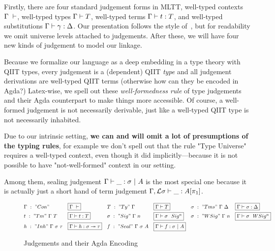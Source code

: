 Firstly, there are four standard judgement forms in MLTT,
well-typed contexts $\goodCtx{\Gamma}{l}$, well-typed types
$\goodType{\Gamma}{T}{l}$, well-typed terms $\goodTerm{\Gamma}{t}{T}$, and
well-typed substitutions $\goodSub{\Gamma}{\gamma}{\Delta}$. Our presentation
follows the style of~\citet{kaposi2019gluing}, but for readability we
omit universe levels attached to judgements.
After these,
we will have four new kinds of judgement to model our linkage.

Because we formalize our language as a deep embedding in a type theory with QIIT types, every judgement is a (dependent) QIIT \textit{type} and all judgement derivations are well-typed QIIT terms (otherwise how can they be encoded in Agda?)
Latex-wise, we spell out these \textit{well-formedness rule} of type
judgements and their Agda counterpart to make things more accessible. Of
course, a well-formed judgement is not necessarily derivable, just like
a well-typed QIIT type is not necessarily inhabited.

Due to our intrinsic setting, \textbf{we can and will omit a lot of presumptions of the typing rules}, for example we don't spell out that the rule "Type Universe" requires a well-typed context, even though it did implicitly---because it is not possible to have "not-well-formed" context in our setting.

Among them, sealing judgement $\goodSeal{\Gamma}{\_}{\sigma}{A}$ is the most special one because it is actually just a short hand of term judgement $\goodTerm{\Gamma , \cL \sigma}{\_}{A[\pi_1]}$. 



\newcommand\mathboxtext[1]{
  \fcolorbox{black}{faint-gray}{\ensuremath{#1}}
}

\begin{figure}[!htb]
  \begin{align*}
    &\Gamma~:~"Con"&&\mathboxtext{\goodCtx{\Gamma}{}} &&T~:~"Ty"~\Gamma&&\mathboxtext{\goodType{\Gamma}{T}{}}  &&\sigma~:~"Tms"~\Gamma~\Delta&&\mathboxtext{\goodSub{\Gamma}{\sigma}{\Delta}}  \\ & t~:~"Tm"~\Gamma~T&&\mathboxtext{\goodTerm{\Gamma}{t}{T}} 
    &&\sigma~:~"Sig"~\Gamma~n&&\mathboxtext{\goodSig{\Gamma}{\sigma}{n}}  &&\sigma~:~"WSig"~\Gamma~n&&\mathboxtext{\goodWSig{\Gamma}{\sigma}{n}} \\ &h~:~"Inh"~\Gamma~\sigma~\tau&&\mathboxtext{\goodInh{\Gamma}{h}{\sigma}{\tau}} && f~:~"Seal"~\Gamma~\sigma~A&&\mathboxtext{\goodSeal{\Gamma}{f}{\sigma}{A}}
  \end{align*}
\caption{Judgements and their Agda Encoding}
\end{figure}

